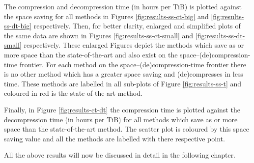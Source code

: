 The compression and decompression time (in hours per TiB) is plotted against the
space saving for all methods in Figures \ref{fig:results-ss-ct-big} and
\ref{fig:results-ss-dt-big} respectively. Then, for better clarity, enlarged and
simplified plots of the same data are shown in Figures \ref{fig:results-ss-ct-small}
and \ref{fig:results-ss-dt-small} respectively. These enlarged Figures depict the
methods which save as or more space than the state-of-the-art and also exist on
the space--(de)compression-time frontier. For each method on the
space--(de)compression-time frontier there is no other method which has a
greater space saving and (de)compresses in less time. These methods are labelled
in all sub-plots of Figure \ref{fig:results-ss-t} and coloured in red is the
state-of-the-art method.

Finally, in Figure \ref{fig:results-ct-dt} the compression time is plotted
against the decompression time (in hours per TiB) for all methods which save as
or more space than the state-of-the-art method. The scatter plot is coloured by
this space saving value and all the methods are labelled with there respective
point.

All the above results will now be discussed in detail in the following chapter.



%












%
